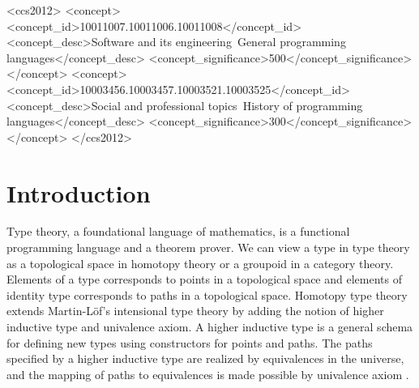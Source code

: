 \documentclass[sigplan,10pt]{acmart}
\begin{document}


\begin{abstract}
This paper provides a sample of a \LaTeX\ document which conforms,
somewhat loosely, to the formatting guidelines for
ACM SIG Proceedings. 
\end{abstract}

%
%
\begin{CCSXML}
<ccs2012>
<concept>
<concept_id>10011007.10011006.10011008</concept_id>
<concept_desc>Software and its engineering~General programming languages</concept_desc>
<concept_significance>500</concept_significance>
</concept>
<concept>
<concept_id>10003456.10003457.10003521.10003525</concept_id>
<concept_desc>Social and professional topics~History of programming languages</concept_desc>
<concept_significance>300</concept_significance>
</concept>
</ccs2012>
\end{CCSXML}



\maketitle

\section{Introduction}

\label{sec:intro}
Type theory, a foundational language of mathematics, is a functional programming language and a theorem prover. We can view a type in type theory as a topological space in homotopy theory or a groupoid in a category theory. Elements of a type corresponds to points in a topological space and elements of identity type corresponds to paths in a topological space. Homotopy type theory extends Martin-Löf’s intensional type theory by adding the notion of higher inductive type and univalence axiom. A higher inductive type is a general schema for defining new types using constructors for points and paths. The paths specified by a higher inductive type are realized by equivalences in the universe, and the mapping of paths to equivalences is made possible by univalence axiom \cite{HoTT-2013}.
\end{document}
